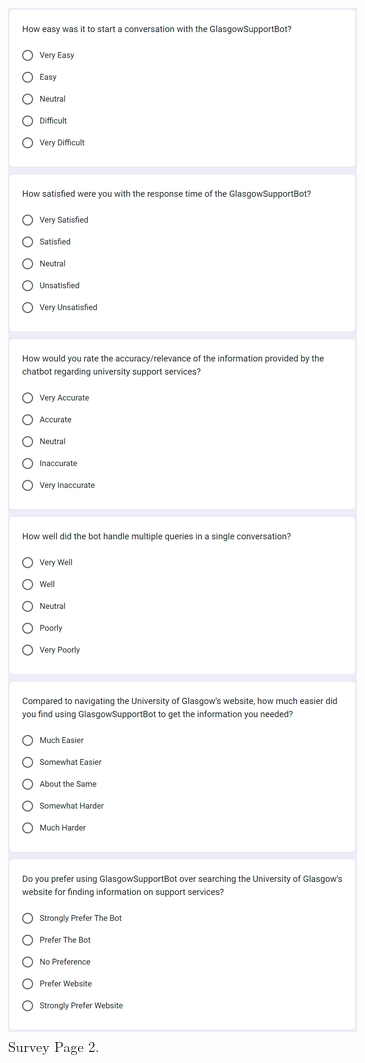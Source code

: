 \documentclass{l4proj}
\begin{document}
\begin{appendices}
\clearpage %

\begin{figure}[h!]
  \centering
  \begin{adjustbox}{center,max height=0.77\textheight, max width=\linewidth}
    \includegraphics{images/survey2.png}
  \end{adjustbox}
  \caption{Survey Page 2.}
  \label{fig: Survey Page 2}
\end{figure}
\clearpage %


\end{appendices}
\end{document}
